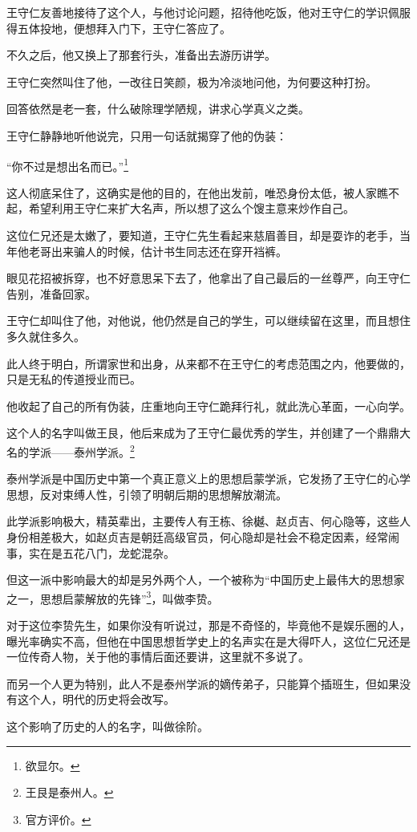 \begin{multicols}{\theparacolNo}
		王守仁友善地接待了这个人，与他讨论问题，招待他吃饭，他对王守仁的学识佩服得五体投地，便想拜入门下，王守仁答应了。

		不久之后，他又换上了那套行头，准备出去游历讲学。

		王守仁突然叫住了他，一改往日笑颜，极为冷淡地问他，为何要这种打扮。

		回答依然是老一套，什么破除理学陋规，讲求心学真义之类。

		王守仁静静地听他说完，只用一句话就揭穿了他的伪装：

		“你不过是想出名而已。”\footnote{欲显尔。}

		这人彻底呆住了，这确实是他的目的，在他出发前，唯恐身份太低，被人家瞧不起，希望利用王守仁来扩大名声，所以想了这么个馊主意来炒作自己。

		这位仁兄还是太嫩了，要知道，王守仁先生看起来慈眉善目，却是耍诈的老手，当年他老哥出来骗人的时候，估计书生同志还在穿开裆裤。

		眼见花招被拆穿，也不好意思呆下去了，他拿出了自己最后的一丝尊严，向王守仁告别，准备回家。

		王守仁却叫住了他，对他说，他仍然是自己的学生，可以继续留在这里，而且想住多久就住多久。

		此人终于明白，所谓家世和出身，从来都不在王守仁的考虑范围之内，他要做的，只是无私的传道授业而已。

		他收起了自己的所有伪装，庄重地向王守仁跪拜行礼，就此洗心革面，一心向学。

		这个人的名字叫做王艮，他后来成为了王守仁最优秀的学生，并创建了一个鼎鼎大名的学派——泰州学派。\footnote{王艮是泰州人。}

		泰州学派是中国历史中第一个真正意义上的思想启蒙学派，它发扬了王守仁的心学思想，反对束缚人性，引领了明朝后期的思想解放潮流。

		此学派影响极大，精英辈出，主要传人有王栋、徐樾、赵贞吉、何心隐等，这些人身份相差极大，如赵贞吉是朝廷高级官员，何心隐却是社会不稳定因素，经常闹事，实在是五花八门，龙蛇混杂。

		但这一派中影响最大的却是另外两个人，一个被称为“中国历史上最伟大的思想家之一，思想启蒙解放的先锋”\footnote{官方评价。}，叫做李贽。

		对于这位李贽先生，如果你没有听说过，那是不奇怪的，毕竟他不是娱乐圈的人，曝光率确实不高，但他在中国思想哲学史上的名声实在是大得吓人，这位仁兄还是一位传奇人物，关于他的事情后面还要讲，这里就不多说了。

		而另一个人更为特别，此人不是泰州学派的嫡传弟子，只能算个插班生，但如果没有这个人，明代的历史将会改写。

		这个影响了历史的人的名字，叫做徐阶。


\end{multicols}
